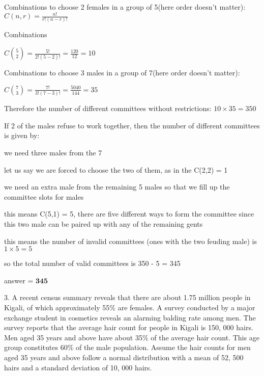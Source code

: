 \documentclass{article}
\begin{document}
Combinations to choose 2 females in a group of 5(here order doesn't matter): \(C(n,r) = \frac{n!}{r!(n-r)!}\)\newline

Combinations\newline

\(C\binom{5}{2} = \frac{5!}{2!(5-2)!} = \frac{120}{12} = 10\)\newline

Combinations to choose 3 males in a group of 7(here order doesn't matter):\newline

\(C\binom{7}{3} = \frac{7!}{3!(7-3)!} = \frac{5040}{144} = 35\)\newline

Therefore the number of different committees without restrictions: \(10 \times 35 = 350\)\newline

If 2 of the males refuse to work together, then the number of different committees is given by:

we need three males from the 7\newline

let us say we are forced to choose the two of them, as in the C(2,2) = 1\newline

we need an extra male from the remaining 5 males so that we fill up the committee slots for males\newline

this means C(5,1) = 5, there are five different ways to form the committee since this two male can be paired up with any of the remaining gents\newline

this means the number of invalid committees (ones with the two feuding male) is  \(1 \times 5 = 5\)\newline

so the total number of valid committees is 350 - 5 = 345\newline

answer = \(\mathbf{345}\)\newline


3. A recent census summary reveals that there are about 1.75 million people in Kigali, of which approximately 55\% are females. A survey conducted by a major exchange student in cosmetics reveals an alarming balding rate among men. The survey reports that the average hair count for people in Kigali is 150, 000 hairs. Men aged 35 years and above have about 35\% of the average
hair count. This age group constitutes 60\% of the male population. Assume the hair counts for men aged 35 years and above follow a normal distribution with a mean of 52, 500 hairs and a standard deviation of 10, 000 hairs.
\end{document}
